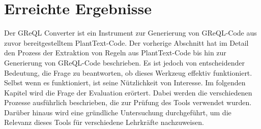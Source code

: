 \section{Erreichte Ergebnisse}

Der GReQL Converter ist ein Instrument zur Generierung von GReQL-Code aus zuvor bereitgestelltem PlantText-Code. Der
vorherige Abschnitt hat im Detail den Prozess der Extraktion von Regeln aus PlantText-Code bis hin zur Generierung
von GReQL-Code beschrieben. Es ist jedoch von entscheidender Bedeutung, die Frage zu beantworten, ob dieses Werkzeug
effektiv funktioniert. Selbst wenn es funktioniert, ist seine Nützlichkeit von Interesse. Im folgenden Kapitel wird
die Frage der Evaluation erörtert. Dabei werden die verschiedenen Prozesse ausführlich beschrieben, die zur Prüfung
des Tools verwendet wurden. Darüber hinaus wird eine gründliche Untersuchung durchgeführt, um die Relevanz dieses
Tools für verschiedene Lehrkräfte nachzuweisen.